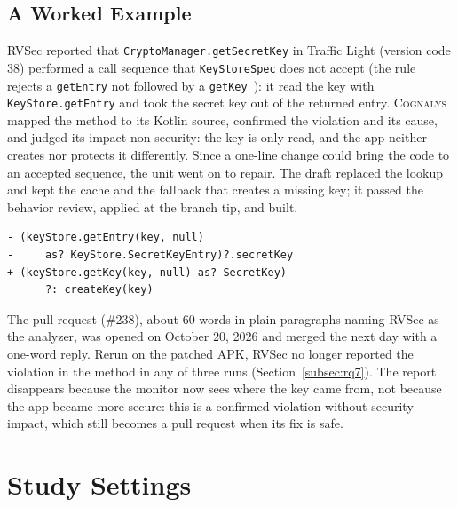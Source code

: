 \documentclass[conference]{IEEEtran}
\newcommand{\system}{\textsc{Cognalys}}
\begin{document}
\subsection{A Worked Example}

RVSec reported that \texttt{CryptoManager.getSecretKey} in Traffic Light
(version code 38) performed a call sequence that \texttt{KeyStoreSpec} does not
accept (the rule rejects a \texttt{getEntry} not followed by a
\texttt{getKey}~\cite{costa2026effectiveness}): it read the key with \texttt{KeyStore.getEntry} and took the secret key
out of the returned entry. \system{} mapped the method to its Kotlin source,
confirmed the violation and its cause, and judged its impact non-security: the
key is only read, and the app neither creates nor protects it differently.
Since a one-line change could bring the code to an accepted sequence, the unit
went on to repair. The draft replaced the lookup and kept the cache and the
fallback that creates a missing key; it passed the behavior review, applied at
the branch tip, and built.

{\scriptsize
\begin{verbatim}
- (keyStore.getEntry(key, null)
-     as? KeyStore.SecretKeyEntry)?.secretKey
+ (keyStore.getKey(key, null) as? SecretKey)
      ?: createKey(key)
\end{verbatim}}

The pull request (\#238), about 60 words in plain paragraphs naming RVSec as
the analyzer, was opened on October 20, 2026 and merged the next day with a
one-word reply. Rerun on the patched APK, RVSec no longer reported the
violation in the method in any of three runs (Section~\ref{subsec:rq7}). The
report disappears because the monitor now sees where the key came from, not
because the app became more secure: this is a confirmed violation without
security impact, which still becomes a pull request when its fix is safe.

\section{Study Settings}
\label{sec:settings}
\end{document}
